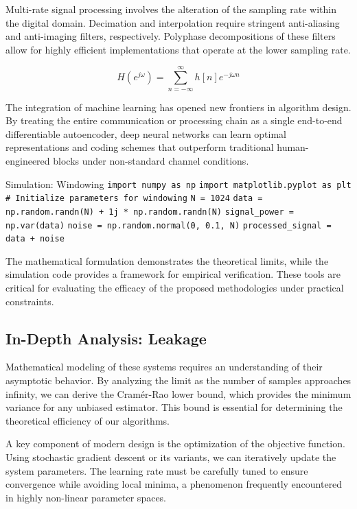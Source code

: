 Multi-rate signal processing involves the alteration of the sampling rate within the digital domain. Decimation and interpolation require stringent anti-aliasing and anti-imaging filters, respectively. Polyphase decompositions of these filters allow for highly efficient implementations that operate at the lower sampling rate.

\begin{equation}
    H(e^{j\omega}) = \sum_{n=-\infty}^{\infty} h[n] e^{-j\omega n}
\end{equation}

The integration of machine learning has opened new frontiers in algorithm design. By treating the entire communication or processing chain as a single end-to-end differentiable autoencoder, deep neural networks can learn optimal representations and coding schemes that outperform traditional human-engineered blocks under non-standard channel conditions.

\begin{pythonbox}{Simulation: Windowing}
\texttt{import numpy as np}
\texttt{import matplotlib.pyplot as plt}
\texttt{}
\texttt{\# Initialize parameters for windowing}
\texttt{N = 1024}
\texttt{data = np.random.randn(N) + 1j * np.random.randn(N)}
\texttt{signal\_power = np.var(data)}
\texttt{noise = np.random.normal(0, 0.1, N)}
\texttt{processed\_signal = data + noise}
\end{pythonbox}

\vspace{0.5cm}
The mathematical formulation demonstrates the theoretical limits, while the simulation code provides a framework for empirical verification. These tools are critical for evaluating the efficacy of the proposed methodologies under practical constraints.


\subsection{In-Depth Analysis: Leakage}
Mathematical modeling of these systems requires an understanding of their asymptotic behavior. By analyzing the limit as the number of samples approaches infinity, we can derive the Cramér-Rao lower bound, which provides the minimum variance for any unbiased estimator. This bound is essential for determining the theoretical efficiency of our algorithms.

A key component of modern design is the optimization of the objective function. Using stochastic gradient descent or its variants, we can iteratively update the system parameters. The learning rate must be carefully tuned to ensure convergence while avoiding local minima, a phenomenon frequently encountered in highly non-linear parameter spaces.


